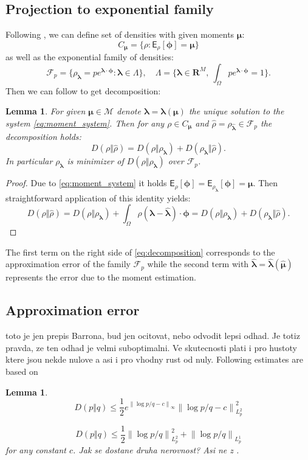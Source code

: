 \documentclass{article}
\newtheorem{lemma}[theorem]{Lemma}
\def\vc#1{\mathbf{\boldsymbol{#1}}}     %
\def \E{{\mathsf E}}
\newcommand{\norm}[1]{\left\lVert#1\right\rVert}
\def\R{\mathbf{R}}
\def\vl{{\vc\lambda}}
\def\estvl{{\vc{\hat\lambda}}}
\def\estrho{\hat\rho}
\def\vmu{\vc\mu}
\def\estvmu{{\vc{\hat\mu}}}
\def\vphi{\vc\phi}
\newcommand{\jb}[1]{{\color{violet}#1}}  %
\begin{document}
\subsection{Projection to exponential family}

Following \cite{Barron1991}, we can define set of densities with given moments $\vmu$:
\[
    C_{\vmu} = \{ \rho : \E_\rho[\vphi] = \vmu \}
\]
as well as the exponential family of densities:
\[
    \mathcal F_{p} = \{ \rho_\vl = 
    p e^{\vl\cdot\vphi} :
    \vl \in \Lambda\},\quad \Lambda = 
    \{\vl\in\R^M,\ \int_\Omega p e^{\vl\cdot\vphi} = 1\}.
\]
Then we can follow \cite[Lemma 2]{Barron1991} to get decomposition:
\begin{lemma}
\label{thm:decomposition}
For given $\vmu \in \mathcal M$ denote $\vl =\vl(\vmu)$ the unique solution to the system \eqref{eq:moment_system}. Then for any $\rho \in C_{\vmu}$ and $\estrho=\rho_\estvl \in\mathcal F_p$ the decomposition holds:
\begin{equation}
    \label{eq:decomposition}
    D(\rho\Vert\estrho) = D(\rho\Vert\rho_{\vl}) + D(\rho_{\vl}\Vert
    \estrho).
\end{equation}
In particular $\rho_{\vl}$ is minimizer of $D(\rho\Vert\rho_{\vl})$ over $\mathcal F_p$.
\end{lemma}
\begin{proof}
Due to \eqref{eq:moment_system} it holds $\E_{\rho}[\vphi] = \E_{\rho_{\vl}}[\vphi] = \vmu$. Then straightforward application of this identity yields:
\[
 D(\rho\Vert\estrho) = D(\rho\Vert\rho_{\vl}) 
 + \int_\Omega \rho (\vl - \estvl)\cdot \vc \phi = D(\rho\Vert\rho_{\vl}) + D(\rho_{\vl}\Vert\estrho).
\]
\end{proof}
The first term on the right side of \eqref{eq:decomposition} corresponds to the approximation error of the family $\mathcal F_p$ while the second term with $\estvl = \estvl(\estvmu)$ represents the error due to the moment estimation. 

\subsection{Approximation error}
\jb{toto je jen prepis Barrona, bud jen ocitovat, nebo odvodit lepsi odhad. Je totiz pravda, ze ten odhad je velmi suboptimalni. Ve skutecnosti plati i pro hustoty ktere jsou nekde nulove a asi i pro vhodny rust od nuly.}
Following estimates are based on \cite[Lemma 2]{Barron1991} 
\begin{lemma} 
  \begin{equation}
      \label{eq:l2_estimate}
      D(p\Vert q) \le \frac{1}{2}e^{\norm{\log p/q - c}_\infty} \norm{\log p/ q - c}_{L^2_p}^2
  \end{equation}

  
  \begin{equation}
      \label{eq:l1_estimate}
      D(p\Vert q) \le \frac{1}{2}\norm{\log p/ q}^2_{L^2_p} + \norm{\log p/ q}_{L^1_p}
  \end{equation}
 for any constant $c$. \jb{Jak se dostane druha nerovnost? Asi ne z \cite[Lemma 2]{Barron1991}}.
\end{lemma}
\end{document}
